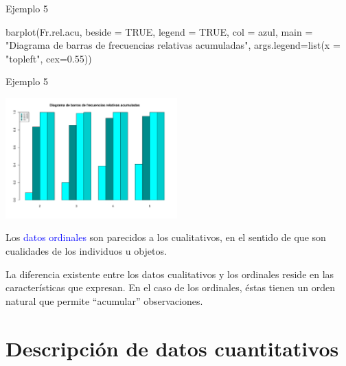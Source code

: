 \documentclass[
  ignorenonframetext,
  aspectratio=169]{beamer}
\newenvironment{Shaded}{\begin{snugshade}}{\end{snugshade}}
\newcommand{\AttributeTok}[1]{\textcolor[rgb]{0.77,0.63,0.00}{#1}}
\newcommand{\ConstantTok}[1]{\textcolor[rgb]{0.00,0.00,0.00}{#1}}
\newcommand{\FloatTok}[1]{\textcolor[rgb]{0.00,0.00,0.81}{#1}}
\newcommand{\FunctionTok}[1]{\textcolor[rgb]{0.00,0.00,0.00}{#1}}
\newcommand{\NormalTok}[1]{#1}
\newcommand{\StringTok}[1]{\textcolor[rgb]{0.31,0.60,0.02}{#1}}
\newcommand\blue[1]{\textcolor{blue}{#1}}
\begin{document}
\begin{frame}[fragile]{Ejemplo 5}
\protect\hypertarget{ejemplo-5-9}{}
\begin{Shaded}
\begin{Highlighting}[]
\FunctionTok{barplot}\NormalTok{(Fr.rel.acu, }\AttributeTok{beside =} \ConstantTok{TRUE}\NormalTok{, }\AttributeTok{legend =} \ConstantTok{TRUE}\NormalTok{, }\AttributeTok{col =}\NormalTok{ azul, }
        \AttributeTok{main =} \StringTok{"Diagrama de barras de frecuencias relativas acumuladas"}\NormalTok{, }
        \AttributeTok{args.legend=}\FunctionTok{list}\NormalTok{(}\AttributeTok{x =} \StringTok{"topleft"}\NormalTok{, }\AttributeTok{cex=}\FloatTok{0.55}\NormalTok{))}
\end{Highlighting}
\end{Shaded}
\end{frame}

\begin{frame}{Ejemplo 5}
\protect\hypertarget{ejemplo-5-10}{}
\begin{center}\includegraphics[width=250px]{Hora4_files/figure-beamer/unnamed-chunk-30-1} \end{center}

Los \blue{datos ordinales} son parecidos a los cualitativos, en el
sentido de que son cualidades de los individuos u objetos.

La diferencia existente entre los datos cualitativos y los ordinales
reside en las características que expresan. En el caso de los ordinales,
éstas tienen un orden natural que permite ``acumular'' observaciones.
\end{frame}

\hypertarget{descripciuxf3n-de-datos-cuantitativos}{%
\section{Descripción de datos
cuantitativos}\label{descripciuxf3n-de-datos-cuantitativos}}
\end{document}
